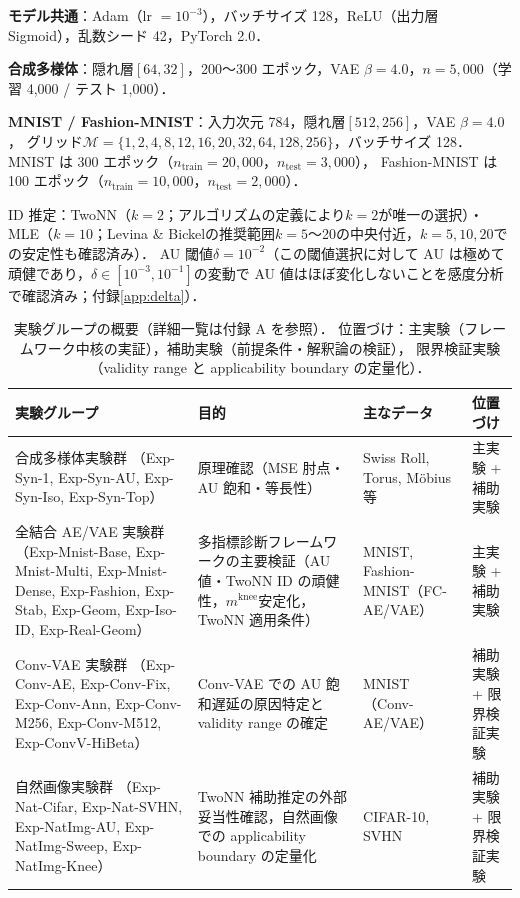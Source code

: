 \documentclass[11pt,a4paper]{jsarticle}
\newcommand{\mknee}{m^{\mathrm{knee}}}
\begin{document}
\textbf{モデル共通}：Adam（lr $= 10^{-3}$），バッチサイズ 128，ReLU（出力層 Sigmoid），乱数シード 42，PyTorch 2.0．

\textbf{合成多様体}：隠れ層$[64, 32]$，200〜300 エポック，VAE $\beta = 4.0$，$n = 5{,}000$（学習 4,000 / テスト 1,000）．

\textbf{MNIST / Fashion-MNIST}：入力次元 784，隠れ層$[512, 256]$，VAE $\beta = 4.0$，
グリッド$\mathcal{M} = \{1,2,4,8,12,16,20,32,64,128,256\}$，バッチサイズ 128．
MNIST は 300 エポック（$n_{\mathrm{train}} = 20{,}000$，$n_{\mathrm{test}} = 3{,}000$），
Fashion-MNIST は 100 エポック（$n_{\mathrm{train}} = 10{,}000$，$n_{\mathrm{test}} = 2{,}000$）．

ID 推定：TwoNN（$k=2$；アルゴリズムの定義により$k=2$が唯一の選択）・MLE（$k=10$；Levina \& Bickel\cite{levina2005mle}の推奨範囲$k=5$〜20の中央付近，$k=5,10,20$での安定性も確認済み）\cite{facco2017twonn,levina2005mle}．
AU 閾値$\delta = 10^{-2}$\cite{lucas2019elbo}（この閾値選択に対して AU は極めて頑健であり，$\delta \in [10^{-3}, 10^{-1}]$の変動で AU 値はほぼ変化しないことを感度分析で確認済み；付録\ref{app:delta}）．

\begin{table}[H]
\centering
\caption{実験グループの概要（詳細一覧は付録 A を参照）．
位置づけ：主実験（フレームワーク中核の実証），補助実験（前提条件・解釈論の検証），
限界検証実験（validity range と applicability boundary の定量化）．}
\label{tab:exp_list}
\small
\begin{tabular}{p{4.5cm}p{4.0cm}p{3.0cm}p{2.5cm}}
\toprule
実験グループ & 目的 & 主なデータ & 位置づけ \\
\midrule
合成多様体実験群
（Exp-Syn-1, Exp-Syn-AU, Exp-Syn-Iso, Exp-Syn-Top）
  & 原理確認（MSE 肘点・AU 飽和・等長性）
  & Swiss Roll, Torus, Möbius 等
  & 主実験 + 補助実験 \\
\addlinespace
全結合 AE/VAE 実験群
（Exp-Mnist-Base, Exp-Mnist-Multi, Exp-Mnist-Dense, Exp-Fashion, Exp-Stab, Exp-Geom, Exp-Iso-ID, Exp-Real-Geom）
  & 多指標診断フレームワークの主要検証（AU 値・TwoNN ID の頑健性，$\mknee$安定化，TwoNN 適用条件）
  & MNIST, Fashion-MNIST（FC-AE/VAE）
  & 主実験 + 補助実験 \\
\addlinespace
Conv-VAE 実験群
（Exp-Conv-AE, Exp-Conv-Fix, Exp-Conv-Ann, Exp-Conv-M256, Exp-Conv-M512, Exp-ConvV-HiBeta）
  & Conv-VAE での AU 飽和遅延の原因特定と validity range の確定
  & MNIST（Conv-AE/VAE）
  & 補助実験 + 限界検証実験 \\
\addlinespace
自然画像実験群
（Exp-Nat-Cifar, Exp-Nat-SVHN, Exp-NatImg-AU, Exp-NatImg-Sweep, Exp-NatImg-Knee）
  & TwoNN 補助推定の外部妥当性確認，自然画像での applicability boundary の定量化
  & CIFAR-10, SVHN
  & 補助実験 + 限界検証実験 \\
\bottomrule
\end{tabular}
\end{table}
\end{document}
